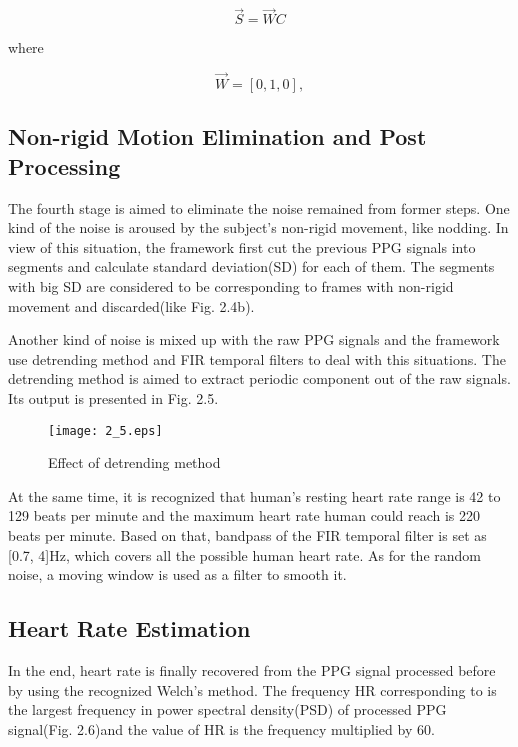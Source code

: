        \begin{equation}
        \vec S = \vec WC
    \end{equation} 

where

	\begin{equation}
        \vec W = [0,1,0],
    \end{equation} 



\subsection{Non-rigid Motion Elimination and Post Processing}
The fourth stage is aimed to eliminate the noise remained from former steps. 
One kind of the noise is aroused by the subject's non-rigid movement, like nodding. In view of this situation, the framework first cut the previous PPG signals into segments and calculate standard deviation(SD) for each of them. The segments with big SD are considered to be corresponding to frames with non-rigid movement and discarded(like Fig. 2.4b).

Another kind of noise is mixed up with the raw PPG signals and the framework use detrending method\cite{tarvainen2002advanced} and FIR temporal filters to deal with this situations. The detrending method is aimed to extract periodic component out of the raw signals. Its output is presented in Fig. 2.5. 

\begin{figure}[ht]
\centering
\texttt{[image: 2\_5.eps]}
\caption{Effect of detrending method}\label{fig:noted-figure}
\end{figure}

At the same time, it is recognized that human's resting heart rate range is 42 to 129 beats per minute and the maximum heart rate human could reach is 220 beats per minute\cite{kolata2001maximum}. Based on that, bandpass of the FIR temporal filter is set as [0.7, 4]Hz, which covers all the possible human heart rate. As for the random noise, a moving window is used as a filter to smooth it. 

\subsection{Heart Rate Estimation}
In the end, heart rate is finally recovered from the PPG signal processed before by using the recognized Welch's method. The frequency HR corresponding to is the largest frequency in power spectral density(PSD) of processed PPG signal(Fig. 2.6)and the value of HR is the frequency multiplied by 60.

